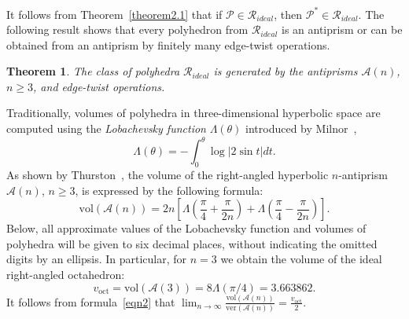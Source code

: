 \documentclass{amsart}
\newtheorem{theorem}{Theorem}[section]
\newcommand{\vol}{\mathrm{vol}}
\newcommand{\voct}{v_{\mathrm{oct}}}
\newcommand{\ver}{\mathrm{ver}}
\begin{document}
It follows from Theorem~\ref{theorem2.1} that if $\mathcal P \in \mathcal R_{ideal}$, then $\mathcal P^* \in \mathcal R_{ideal}$. The following result shows that every polyhedron from $\mathcal{R}_{ideal}$ is an antiprism or can be obtained from an antiprism by finitely many edge-twist operations.
	
\begin{theorem} \cite{Bri} \label{theoremBri}  \label{theorem2.2} 
The class of polyhedra $\mathcal{R}_{ideal}$ is generated by the antiprisms $\mathcal A(n)$, $n \geq 3$, and edge-twist operations. 
\end{theorem}

Traditionally, volumes of polyhedra in three-dimensional hyperbolic space are computed using the \textit{Lobachevsky function} $\Lambda(\theta)$ introduced by Milnor~\cite{Mil82},
$$
\Lambda(\theta) = -\int_0^\theta \log |2\sin t| dt. 
$$ 
As shown by Thurston~\cite{Th80}, the volume of the right-angled hyperbolic $n$-antiprism $\mathcal A(n)$, $n \geq 3$, is expressed by the following formula:
\begin{equation} \label{eqn2}
\vol(\mathcal A(n)) = 2n \left[ \Lambda\left( \frac{\pi}{4} + \frac{\pi}{2n} \right) + \Lambda\left( \frac{\pi}{4} - \frac{\pi}{2n} \right) \right].
\end{equation} 
Below, all approximate values of the Lobachevsky function and volumes of polyhedra will be given to six decimal places, without indicating the omitted digits by an ellipsis.
In particular, for $n=3$ we obtain the volume of the ideal right-angled octahedron:
$$
\voct = \vol(\mathcal A(3)) = 8\Lambda(\pi/4) = 3.663862.
$$	
It follows from formula~\eqref{eqn2} that $\displaystyle \lim_{n\to\infty}\frac{\vol(\mathcal A(n))}{\ver(\mathcal A(n))}=\frac{\voct}{2}$.
\end{document}
